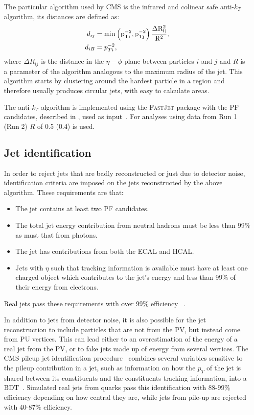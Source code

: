 The particular algorithm used by CMS is the infrared and colinear safe anti-$k_{T}$ algorithm, its distances are defined as:
\begin{align}
d_{ij}&=\rm{min}\left(p_{Ti}^{-2},p_{Tj}^{-2}\right)\frac{\Delta R_{ij}^{2}}{R^{2}},\\
d_{iB}&=p_{Ti}^{-2},
\end{align}
where $\Delta R_{ij}$ is the distance in the $\eta-\phi$ plane between particles $i$ and $j$ and $R$ is a parameter of the algorithm analogous to the maximum radius of the jet. This algorithm starts by clustering around the hardest particle in a region and therefore usually produces circular jets, with easy to calculate areas.

The anti-$k_{T}$ algorithm is implemented using the \textsc{FastJet} package with the \ac{PF} candidates, described in , used as input~\cite{Cacciari:fastjet1}. For analyses using data from \LHC Run 1 (Run 2) $R$ of 0.5 (0.4) is used.

\subsection{Jet identification}
\label{sec:jetid}
In order to reject jets that are badly reconstructed or just due to detector noise, identification criteria are imposed on the jets reconstructed by the above algorithm. These requirements are that:
\begin{itemize}
\item The jet contains at least two \ac{PF} candidates.
\item The total jet energy contribution from neutral hadrons must be less than 99\% as must that from photons.
\item The jet has contributions from both the \ac{ECAL} and \ac{HCAL}.
\item Jets with $\eta$ such that tracking information is available must have at least one charged object which contributes to the jet's energy and less than 99\% of their energy from electrons.
\end{itemize}
Real jets pass these requirements with over 99\% efficiency ~\cite{ARTICLE:CMSAN-14-227}.

In addition to jets from detector noise, it is also possible for the jet reconstruction to include particles that are not from the \ac{PV}, but instead come from \ac{PU} vertices. This can lead either to an overestimation of the energy of a real jet from the \ac{PV}, or to fake jets made up of energy from several vertices. The CMS pileup jet identification procedure~\cite{CMS-PAS-JME-13-005} combines several variables sensitive to the pileup contribution in a jet, such as information on how the $p_{T}$ of the jet is shared between its constituents and the constituents tracking information, into a \ac{BDT}~\cite{TMVA}. Simulated real jets from quarks pass this identification with 88-99\% efficiency depending on how central they are, while jets from pile-up are rejected with 40-87\% efficiency.

